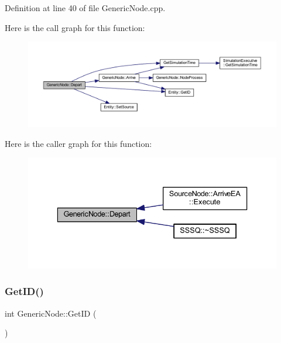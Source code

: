 Definition at line 40 of file Generic\+Node.\+cpp.

Here is the call graph for this function\+:
\nopagebreak
\begin{figure}[H]
\begin{center}
\leavevmode
\includegraphics[width=350pt]{class_generic_node_a2d573208cd3bc049c7068a331c6cd294_cgraph}
\end{center}
\end{figure}
Here is the caller graph for this function\+:
\nopagebreak
\begin{figure}[H]
\begin{center}
\leavevmode
\includegraphics[width=336pt]{class_generic_node_a2d573208cd3bc049c7068a331c6cd294_icgraph}
\end{center}
\end{figure}
\mbox{\label{class_generic_node_aa73c27d677012efdcda65f7908c77758}} 
\subsubsection{\texorpdfstring{Get\+I\+D()}{GetID()}}
{\footnotesize\ttfamily int Generic\+Node\+::\+Get\+ID (\begin{DoxyParamCaption}{ }\end{DoxyParamCaption})\hspace{0.3cm}{\ttfamily [inline]}}



